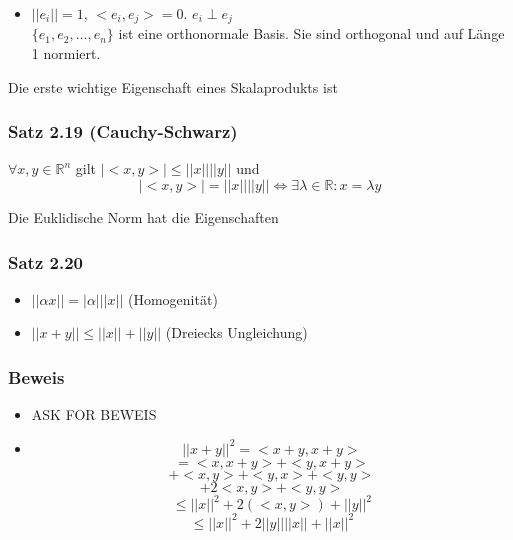 \begin{definition}{2.17}
\begin{itemize}
\begin{center}
\begin{tikzpicture}[scale=1,smooth,
                        line cap=round,line join=round]
    \end{tikzpicture}
\end{center}

    \item $\left|\left|e_i\right|\right|=1$, $<e_i,e_j>=0$. $e_i \perp e_j$\\
$\{e_1,e_2,\dots,e_n\}$ ist eine orthonormale Basis. Sie sind orthogonal und auf Länge 1 normiert.
\end{itemize}
\end{definition}
Die erste wichtige Eigenschaft eines Skalaprodukts ist
\subsubsection*{Satz 2.19 (Cauchy-Schwarz)}
$\forall x,y\in\mathbb{R}^n$ gilt $\left| <x,y>\right| \leq \left|\left| x\right|\right| \left|\left| y\right|\right|$ und \[\left| <x,y>\right|=\left|\left| x\right|\right| \left|\left| y\right|\right|\Leftrightarrow \exists\lambda\in\mathbb{R}: x=\lambda y\]

Die Euklidische Norm hat die Eigenschaften
\subsubsection*{Satz 2.20}
\begin{itemize}
    \item $\left|\left| \alpha x\right|\right|=\left|\alpha\right|\left|\left| x\right|\right|$ (Homogenität)
    \item $\left|\left| x+y\right|\right| \leq \left|\left| x\right|\right| + \left|\left| y\right|\right|$ (Dreiecks Ungleichung)
\end{itemize}

\subsubsection*{Beweis}
\begin{itemize}
    \item ASK FOR BEWEIS 
    \item \[{\left|\left| x+y\right|\right|}^2=<x+y,x+y>\]
\[=<x,x+y>+<y,x+y>\]
\[<x,x>+<x,y>+<y,x>+<y,y>\]
\[<x,x>+2<x,y>+<y,y>\]
\[\leq {\left|\left| x \right|\right|}^2 + 2\left( <x,y>\right) + {\left|\left| y \right|\right|}^2\]
\[\leq {\left|\left| x \right|\right|}^2 + 2{\left|\left| y \right|\right|}  {\left|\left| x \right|\right|} + {\left|\left| x \right|\right|}^2\]
\end{itemize}

